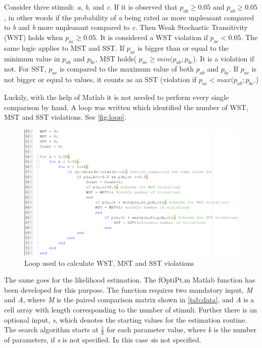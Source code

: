 Consider three stimuli: \textit{a}, \textit{b}, and \textit{c}. If it is observed that $p_{ab} \geq 0.05$ and $p_{ab} \geq 0.05$, in other words if the probability of \textit{a} being rated as more unpleasant compared to \textit{b} and \textit{b} more unpleasant compared to \textit{c}. Then Weak Stochastic Transitivity (WST) holds when $p_{ac} \geq 0.05$. It is considered a WST violation if $p_{ac} < 0.05$. The same logic applies to MST and SST. If $p_{ac}$ is bigger than or equal to the minimum value in $p_{ab}$ and $p_{bc}$, MST holds( $p_{ac}\geq min(p_{ab};p_{bc}$). It is a violation if not. For SST, $p_{ac}$ is compared to the maximum value of both $p_{ab}$ and $p_{bc}$. If $p_{ac}$ is not bigger or equal to values, it counts as an SST (violation if $p_{ac}< max(p_{ab};p_{bc}$.)
 
Luckily, with the help of Matlab it is not needed to perform every single comparison by hand. A loop was written which identified the number of WST, MST and SST violations. See \autoref{fig:loop}.

\begin{figure}[H]
\centering
\includegraphics[width = \textwidth]{Figure/loop.png} 
\caption{Loop used to calculate WST, MST and SST violations}
\label{fig:loop}
\end{figure}



The same goes for the likelihood estimation. The  fOptiPt.m Matlab function has been developed for this purpose. The function requires two mandatory input, \textit{M} and \textit{A}, where \textit{M} is the paired comparison matrix shown in \autoref{tab:data}, and \textit{A} is a cell array with length corresponding to the number of stimuli. Further there is an optional input, \textit{s}, which denotes the starting values for the estimation routine. The search algorithm starts at $\frac{1}{k}$ for each parameter value, where \textit{k} is the number of parameters, if \textit{s} is not specified. In this case \textit{s}is not specified.
